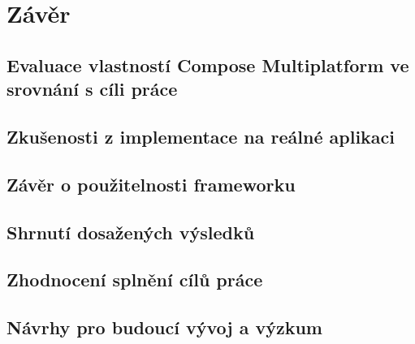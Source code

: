\chapter{Závěr}

\section{Evaluace vlastností Compose Multiplatform ve srovnání s cíli práce}
\section{Zkušenosti z implementace na reálné aplikaci}
\section{Závěr o použitelnosti frameworku}

\section{Shrnutí dosažených výsledků}
\section{Zhodnocení splnění cílů práce}
\section{Návrhy pro budoucí vývoj a výzkum}


